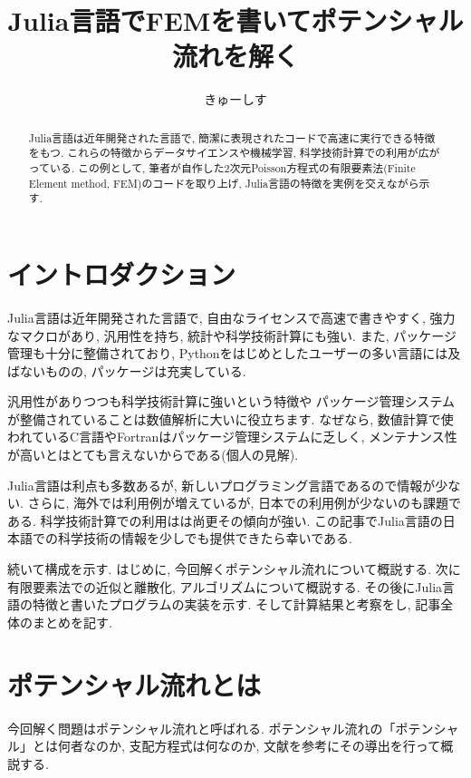 \documentclass{ltjsarticle}
\begin{document}
\title{Julia言語でFEMを書いてポテンシャル流れを解く}
\author{きゅーしす}
\maketitle
\begin{abstract}
    Julia言語は近年開発された言語で, 簡潔に表現されたコードで高速に実行できる特徴をもつ. 
    これらの特徴からデータサイエンスや機械学習, 科学技術計算での利用が広がっている. 
    この例として, 筆者が自作した2次元Poisson方程式の有限要素法(Finite Element method, FEM)のコードを取り上げ, 
    Julia言語の特徴を実例を交えながら示す. 
\end{abstract}


\section{イントロダクション}
Julia言語は近年開発された言語で, 自由なライセンスで高速で書きやすく, 
強力なマクロがあり, 汎用性を持ち, 統計や科学技術計算にも強い\cite{Bezanson2012}. 
また, パッケージ管理も十分に整備されており, 
Pythonをはじめとしたユーザーの多い言語には及ばないものの, パッケージは充実している. 

汎用性がありつつも科学技術計算に強いという特徴や
パッケージ管理システムが整備されていることは数値解析に大いに役立ちます. 
なぜなら, 数値計算で使われているC言語やFortranはパッケージ管理システムに乏しく, 
メンテナンス性が高いとはとても言えないからである(個人の見解). 

Julia言語は利点も多数あるが, 新しいプログラミング言語であるので情報が少ない. 
さらに, 海外では利用例が増えているが, 日本での利用例が少ないのも課題である. 
科学技術計算での利用はは尚更その傾向が強い. 
この記事でJulia言語の日本語での科学技術の情報を少しでも提供できたら幸いである. 

続いて構成を示す. 
はじめに, 今回解くポテンシャル流れについて概説する. 
次に有限要素法での近似と離散化, アルゴリズムについて概説する. 
その後にJulia言語の特徴と書いたプログラムの実装を示す. 
そして計算結果と考察をし, 記事全体のまとめを記す. 

\section{ポテンシャル流れとは}
今回解く問題はポテンシャル流れと呼ばれる. 
ポテンシャル流れの「ポテンシャル」とは何者なのか, 
支配方程式は何なのか,
文献\cite{Kanbe1995}を参考にその導出を行って概説する. 
\end{document}
